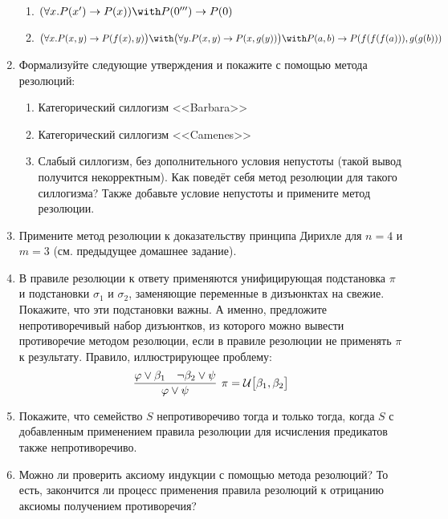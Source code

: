 \documentclass[10pt,a4paper,oneside]{article}
\begin{document}
\begin{enumerate}
\begin{enumerate}
\item $(\forall x.P(x') \rightarrow P(x)) \with P(0''') \rightarrow P(0)$
\item $\big(\forall x.P(x,y)\rightarrow P(f(x),y)\big) \with \big(\forall y.P(x,y) \rightarrow P(x,g(y))\big) \with P(a,b)\rightarrow P(f(f(f(a))),g(g(b)))$
\end{enumerate}
\item Формализуйте следующие утверждения и покажите с помощью метода резолюций:
\begin{enumerate}
\item Категорический силлогизм <<Barbara>>
\item Категорический силлогизм <<Camenes>>
\item Слабый силлогизм, без дополнительного условия непустоты (такой вывод получится некорректным).
Как поведёт себя метод резолюции для такого силлогизма? Также добавьте условие непустоты и примените метод резолюции.
\end{enumerate}
\item Примените метод резолюции к доказательству принципа Дирихле для $n=4$ и $m=3$ (см. предыдущее домашнее задание).
\item В правиле резолюции к ответу применяются унифицирующая подстановка $\pi$ 
и подстановки $\sigma_1$ и $\sigma_2$, заменяющие переменные в дизъюнктах на свежие. 
Покажите, что эти подстановки важны. А именно, предложите непротиворечивый набор дизъюнтков, из которого можно вывести противоречие
методом резолюции, если в правиле резолюции не применять $\pi$ к результату. Правило, иллюстрирующее проблему:
$$\infer[\pi = {\mathcal{U}\big[ \beta_1, \beta_2 \big]}]{\varphi\vee\psi}{\varphi\vee\beta_1\quad\neg\beta_2\vee\psi}$$
\item Покажите, что семейство $S$ непротиворечиво тогда и только тогда, когда $S$ с добавленным 
применением правила резолюции для исчисления предикатов также непротиворечиво.
\item Можно ли проверить аксиому индукции с помощью метода резолюций? То есть, закончится ли процесс 
применения правила резолюций к отрицанию аксиомы получением противоречия?
\end{enumerate}
\end{document}
